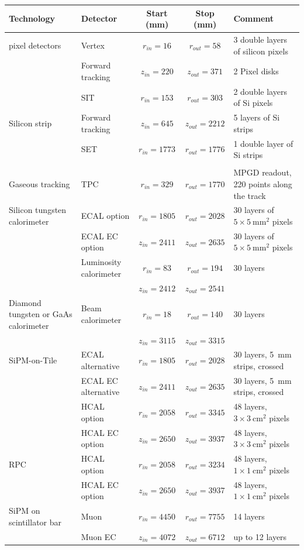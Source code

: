 \documentclass[%
 amsmath,amssymb,
 aps,
 longbibliography,
]{revtex4-1}
\renewcommand{\toprule}{\hline}
\newcommand{\midrule}{\hline}
\begin{document}
\begin{table}[th]
    \centering
    \begin{tabular}{|l|l|c|c|p{4cm}|}
    \toprule
        {\bf Technology} & {\bf Detector} & {\bf Start (mm)}   & {\bf Stop (mm)} & {\bf Comment} \\
        \midrule
pixel detectors & Vertex & $r_{in}=16$   & $r_{out}=58$   & 3 double layers of silicon pixels \\
& Forward tracking  & $z_{in}=220$ & $z_{out}=371$ & 2 Pixel disks \\
 & SIT    & $r_{in}=153$  & $r_{out}=303$  & 2 double layers of Si pixels            \\
\midrule
Silicon strip & Forward tracking  & $z_{in}=645$ & $z_{out}=2212$ & 5 layers of Si strips\\
                & SET    & $r_{in}=1773$ & $r_{out}=1776$ & 1 double layer of Si strips           \\
                & & & & \\
\midrule
Gaseous tracking & TPC & $r_{in}=329$ & $r_{out}=1770$ & MPGD readout, 220 points along the track\\
\midrule
Silicon tungsten calorimeter & ECAL option& $r_{in}=1805$ & $r_{out}=2028$ & 30 layers of $5\times 5~\mathrm{mm}^2$ pixels \\
& ECAL EC option & $z_{in}=2411$ & $z_{out}=2635$ & 30 layers of $5\times 5~\mathrm{mm}^2$ pixels \\
& Luminosity calorimeter &$r_{in}=83$ & $r_{out}=194$& 30 layers\\
& &$z_{in}=2412$ & $z_{out}=2541$& \\
\midrule
Diamond tungsten or GaAs calorimeter & Beam calorimeter &$r_{in}=18$ &$r_{out}=140$& 30 layers\\
&& $z_{in}=3115$&$z_{out}=3315$&\\
\midrule
SiPM-on-Tile & ECAL alternative   & $r_{in}=1805$ & $r_{out}=2028$ & 30 layers, 5~mm strips, crossed\\
& ECAL EC alternative& $z_{in}=2411$ & $z_{out}=2635$ & 30 layers, 5~mm strips, crossed\\
             & HCAL option   & $r_{in}=2058$ & $r_{out}=3345$ & 48 layers, $3\times 3~\mathrm{cm}^2$ pixels\\
             & HCAL EC option& $z_{in}=2650$ & $z_{out}=3937$ & 48 layers, $3\times 3~\mathrm{cm}^2$ pixels\\
\midrule
RPC          & HCAL option   & $r_{in}=2058$ & $r_{out}=3234$ & 48 layers, $1 \times 1 ~\mathrm{cm}^2$ pixels \\
& HCAL EC option & $z_{in}=2650$ & $z_{out}=3937$ & 48 layers, $1 \times 1~\mathrm{cm}^2$ pixels\\
\midrule
SiPM on scintillator bar & Muon & $r_{in}=4450$ & $r_{out}=7755$ & 14 layers \\
& Muon EC & $z_{in}=4072$ & $z_{out}=6712$ & up to 12 layers \\


\end{tabular}
\end{table}
\end{document}
